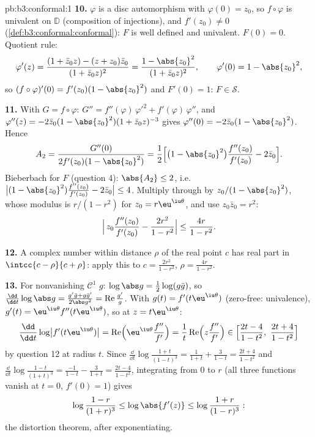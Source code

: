 \begin{solution}{pb:b3:conformal:1}
\textbf{10.} $\varphi$ is a disc automorphism with
$\varphi(0) = z_0$, so $f\circ\varphi$ is univalent on
$\mathbb D$ (composition of injections), and $f'(z_0) \neq
0$ (\cref{def:b3:conformal:conformal}): $F$ is well defined
and univalent. $F(0) = 0$. Quotient rule:
\[
\varphi'(z) = \frac{(1 + \bar z_0z) - (z + z_0)\bar z_0}
{(1 + \bar z_0z)^2}
= \frac{1 - \abs{z_0}^2}{(1 + \bar z_0z)^2},
\qquad \varphi'(0) = 1 - \abs{z_0}^2 ,
\]
so $(f\circ\varphi)'(0) = f'(z_0)(1 - \abs{z_0}^2)$ and
$F'(0) = 1$: $F \in \mathcal S$.

\textbf{11.} With $G = f\circ\varphi$: $G'' =
f''(\varphi)\,\varphi'^2 + f'(\varphi)\,\varphi''$, and
$\varphi''(z) = -2\bar z_0(1 - \abs{z_0}^2)(1 + \bar
z_0z)^{-3}$ gives $\varphi''(0) = -2\bar z_0(1 -
\abs{z_0}^2)$. Hence
\[
A_2 = \frac{G''(0)}{2f'(z_0)(1 - \abs{z_0}^2)}
= \frac12\Bigl[\bigl(1 - \abs{z_0}^2\bigr)
\frac{f''(z_0)}{f'(z_0)} - 2\bar z_0\Bigr] .
\]
Bieberbach for $F$ (question 4): $\abs{A_2} \leq 2$, i.e.\
$\bigl|(1 - \abs{z_0}^2)\frac{f''(z_0)}{f'(z_0)} - 2\bar
z_0\bigr| \leq 4$. Multiply through by
$z_0/(1 - \abs{z_0}^2)$, whose modulus is
$r/(1 - r^2)$ for $z_0 = r\eu^{\iu\theta}$, and use $z_0\bar
z_0 = r^2$:
\[
\Bigl|\,z_0\frac{f''(z_0)}{f'(z_0)} -
\frac{2r^2}{1 - r^2}\Bigr| \leq \frac{4r}{1 - r^2} .
\]

\textbf{12.} A complex number within distance $\rho$ of the
real point $c$ has real part in $\intcc{c - \rho}{c +
\rho}$: apply this to $c = \frac{2r^2}{1-r^2}$, $\rho =
\frac{4r}{1-r^2}$.

\textbf{13.} For nonvanishing $\mathcal C^1$ $g$:
$\log\abs g = \frac12\log(g\bar g)$, so $\frac{\dd}{\dd
t}\log\abs g = \frac{g'\bar g + g\bar g'}{2\abs g^2} =
\operatorname{Re}\frac{g'}g$. With $g(t) =
f'(t\eu^{\iu\theta})$ (zero-free: univalence), $g'(t) =
\eu^{\iu\theta}f''(t\eu^{\iu\theta})$, so at $z =
t\eu^{\iu\theta}$:
\[
\frac{\dd}{\dd t}\log\bigl|f'(t\eu^{\iu\theta})\bigr|
= \operatorname{Re}\Bigl(\eu^{\iu\theta}
\frac{f''}{f'}\Bigr)
= \frac1t\operatorname{Re}\Bigl(z\frac{f''}{f'}\Bigr)
\in \Bigl[\frac{2t - 4}{1 - t^2},\
\frac{2t + 4}{1 - t^2}\Bigr]
\]
by question 12 at radius $t$. Since $\frac{\dd}{\dd
t}\log\frac{1+t}{(1-t)^3} = \frac1{1+t} + \frac3{1-t} =
\frac{2t+4}{1-t^2}$ and $\frac{\dd}{\dd
t}\log\frac{1-t}{(1+t)^3} = \frac{-1}{1-t} - \frac3{1+t} =
\frac{2t-4}{1-t^2}$, integrating from $0$ to $r$ (all three
functions vanish at $t = 0$, $f'(0) = 1$) gives
\[
\log\frac{1-r}{(1+r)^3} \leq \log\abs{f'(z)} \leq
\log\frac{1+r}{(1-r)^3} :
\]
the distortion theorem, after exponentiating.


\end{solution}

